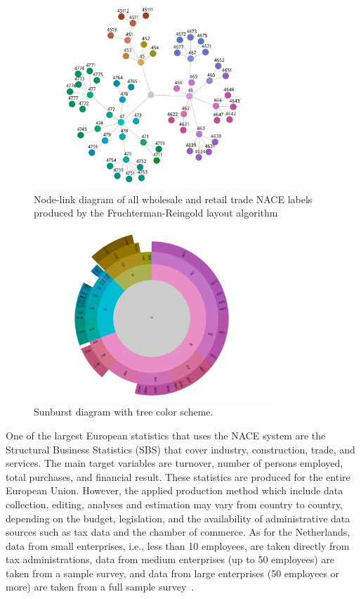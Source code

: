 \documentclass[journal]{vgtc}                %
\begin{document}
\begin{figure}[t]
  \centering
  \includegraphics[width=3.5in]{Gbusiness_FR.pdf}
  \caption{Node-link diagram of all wholesale and retail trade NACE labels produced by the Fruchterman-Reingold layout algorithm}\label{fig:graphFRApp}
\end{figure}



\begin{figure}[!b]
  \centering
  \includegraphics[width=3.5in]{sunburst/sunburst.pdf}
  \caption{Sunburst diagram with tree color scheme.}\label{fig:sunburst}
\end{figure}

One of the largest European statistics that uses the NACE system are the Structural Business Statistics (SBS) that cover industry, construction, trade, and services. The main target variables are turnover, number of persons employed, total purchases, and financial result. These statistics are produced for the entire European Union. However, the applied production method which include data collection, editing, analyses and estimation may vary from country to country, depending on the budget, legislation, and the availability of administrative data sources such as tax data and the chamber of commerce. As for the Netherlands, data from small enterprises, i.e., less than 10 employees, are taken directly from tax administrations, data from medium enterprises (up to 50 employees) are taken from a sample survey, and data from large enterprises (50 employees or more) are taken from a full sample survey~\cite{cbsSBS}.
\end{document}
